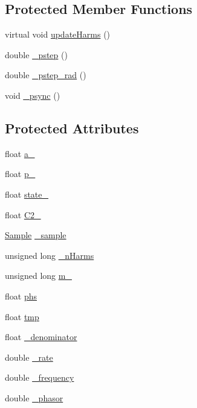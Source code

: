 \subsection*{Protected Member Functions}
\begin{DoxyCompactItemize}
\item 
virtual void \hyperlink{classDSG_1_1BLITSaw_ae0f3f38ca9ae61f9a377f7ca141995b3}{update\+Harms} ()
\item 
double \hyperlink{classDSG_1_1SignalGenerator_ac0d781b8673b3a283bf7c133290ede50}{\+\_\+pstep} ()
\item 
double \hyperlink{classDSG_1_1SignalGenerator_ae660eb4caa88b8d278f8d24d0908a487}{\+\_\+pstep\+\_\+rad} ()
\item 
void \hyperlink{classDSG_1_1SignalGenerator_a05baccb38d1e52860d4fcf7cb8430efc}{\+\_\+psync} ()
\end{DoxyCompactItemize}
\subsection*{Protected Attributes}
\begin{DoxyCompactItemize}
\item 
float \hyperlink{classDSG_1_1BLITSaw_a71b040fae6e1d67b56c580db9f4e5c3a}{a\+\_\+}
\item 
float \hyperlink{classDSG_1_1BLITSaw_addcb3fc898bb08c71cfe81e12e2891b9}{p\+\_\+}
\item 
float \hyperlink{classDSG_1_1BLITSaw_a8ee93d1e83e22bd5ead8600ccb1f9082}{state\+\_\+}
\item 
float \hyperlink{classDSG_1_1BLITSaw_adac26390db64c9bb7e97036367bcf30f}{C2\+\_\+}
\item 
\hyperlink{classDSG_1_1Sample}{Sample} \hyperlink{classDSG_1_1BLIT_a4fa5d5d8a8d5dd64e027067d0018570d}{\+\_\+sample}
\item 
unsigned long \hyperlink{classDSG_1_1BLIT_afe749d26f1503740bedd54f5147bc66d}{\+\_\+n\+Harms}
\item 
unsigned long \hyperlink{classDSG_1_1BLIT_a93504a847d83314bbd9020750820242b}{m\+\_\+}
\item 
float \hyperlink{classDSG_1_1BLIT_a392dc88ed2691c6637a6afe8607881c6}{phs}
\item 
float \hyperlink{classDSG_1_1BLIT_ac0570d5d963ca947e8860a547df7b9dc}{tmp}
\item 
float \hyperlink{classDSG_1_1BLIT_a664b4f06a7b5657261cfaa30dd503c16}{\+\_\+denominator}
\item 
double \hyperlink{classDSG_1_1SignalGenerator_aa10f6c85d9adee901139ea7fb346f39d}{\+\_\+rate}
\item 
double \hyperlink{classDSG_1_1SignalGenerator_a67e296e3506dcdf09402c667cddff9ac}{\+\_\+frequency}
\item 
double \hyperlink{classDSG_1_1SignalGenerator_ac2271b582bf699275f077ecb642a8cd9}{\+\_\+phasor}
\end{DoxyCompactItemize}



